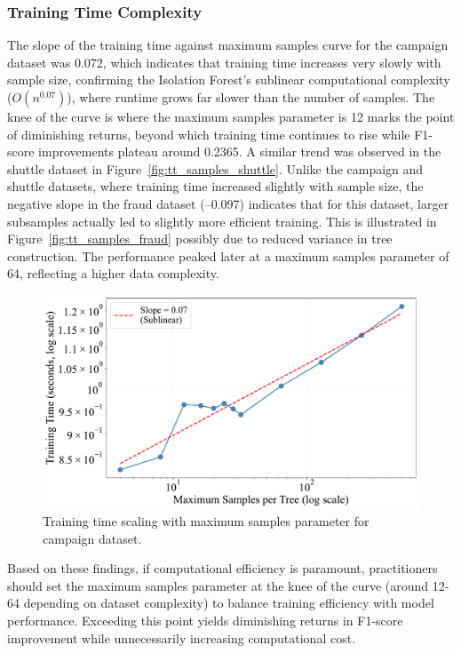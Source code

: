\documentclass[10pt, conference]{IEEEtran}
\begin{document}
\subsubsection{Training Time Complexity}
The slope of the training time against maximum samples curve for the campaign dataset was 0.072, which indicates that training time increases very slowly with sample size, confirming the Isolation Forest’s sublinear computational complexity ($O(n^{0.07})$), where runtime grows far slower than the number of samples. The knee of the curve is where the maximum samples parameter is 12 marks the point of diminishing returns, beyond which training time continues to rise while F1-score improvements plateau around 0.2365. A similar trend was observed in the shuttle dataset in Figure~\ref{fig:tt_samples_shuttle}. Unlike the campaign and shuttle datasets, where training time increased slightly with sample size, the negative slope in the fraud dataset (–0.097) indicates that for this dataset, larger subsamples actually led to slightly more efficient training. This is illustrated in Figure~\ref{fig:tt_samples_fraud} possibly due to reduced variance in tree construction. The performance peaked later at a maximum samples parameter of 64, reflecting a higher data complexity.
 
\begin{figure}[H]
	\centering
	\includegraphics[width=0.95\linewidth]{../results/campaign/max_samples/training_time_scaling.pdf}
	\caption{Training time scaling with maximum samples parameter for campaign dataset.}
	\label{fig:tt_samples_campaign}
\end{figure}

Based on these findings, if computational efficiency is paramount, practitioners should set the maximum samples parameter at the knee of the curve (around 12-64 depending on dataset complexity) to balance training efficiency with model performance. Exceeding this point yields diminishing returns in F1-score improvement while unnecessarily increasing computational cost.
\end{document}
